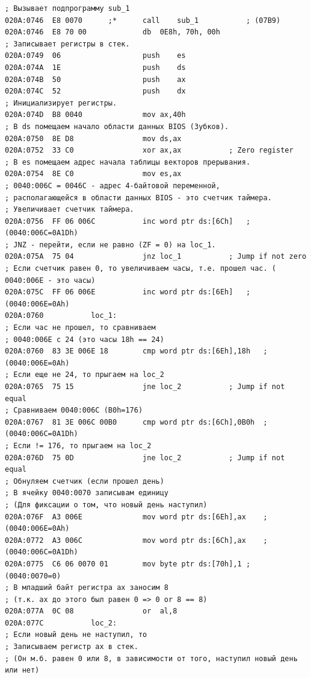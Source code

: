 
\begin{lstlisting}[label=some-code,caption=Код прерывания INT 8h]
; Вызывает подпрограмму sub_1
020A:0746  E8 0070		;*		call	sub_1			; (07B9)
020A:0746  E8 70 00				db	0E8h, 70h, 00h
; Записывает регистры в стек.
020A:0749  06					push	es
020A:074A  1E					push	ds
020A:074B  50					push	ax
020A:074C  52					push	dx
; Инициализирует регистры.
020A:074D  B8 0040				mov	ax,40h
; В ds помещаем начало области данных BIOS (Зубков).
020A:0750  8E D8				mov	ds,ax
020A:0752  33 C0				xor	ax,ax			; Zero register
; В es помещаем адрес начала таблицы векторов прерывания.
020A:0754  8E C0				mov	es,ax
; 0040:006C = 0046С - адрес 4-байтовой переменной,
; располагающейся в области данных BIOS - это счетчик таймера.
; Увеличивает счетчик таймера.
020A:0756  FF 06 006C			inc	word ptr ds:[6Ch]	; (0040:006C=0A1Dh)
; JNZ - перейти, если не равно (ZF = 0) на loc_1. 
020A:075A  75 04				jnz	loc_1			; Jump if not zero
; Если счетчик равен 0, то увеличиваем часы, т.е. прошел час. ( 0040:006E - это часы)
020A:075C  FF 06 006E			inc	word ptr ds:[6Eh]	; (0040:006E=0Ah)
020A:0760			loc_1:
; Если час не прошел, то сравниваем
; 0040:006E с 24 (это часы 18h == 24)
020A:0760  83 3E 006E 18		cmp	word ptr ds:[6Eh],18h	; (0040:006E=0Ah)
; Если еще не 24, то прыгаем на loc_2 
020A:0765  75 15				jne	loc_2			; Jump if not equal
; Сравниваем 0040:006C (B0h=176) 
020A:0767  81 3E 006C 00B0		cmp	word ptr ds:[6Ch],0B0h	; (0040:006C=0A1Dh)
; Если != 176, то прыгаем на loc_2
020A:076D  75 0D				jne	loc_2			; Jump if not equal
; Обнуляем счетчик (если прошел день)
; В ячейку 0040:0070 записывам единицу
; (Для фиксации о том, что новый день наступил)
020A:076F  A3 006E				mov	word ptr ds:[6Eh],ax	; (0040:006E=0Ah)
020A:0772  A3 006C				mov	word ptr ds:[6Ch],ax	; (0040:006C=0A1Dh)
020A:0775  C6 06 0070 01		mov	byte ptr ds:[70h],1	; (0040:0070=0)
; В младший байт регистра ax заносим 8 
; (т.к. ax до этого был равен 0 => 0 or 8 == 8)
020A:077A  0C 08				or	al,8
020A:077C			loc_2:
; Если новый день не наступил, то
; Записываем регистр ax в стек.
; (Он м.б. равен 0 или 8, в зависимости от того, наступил новый день или нет)

\end{lstlisting}
